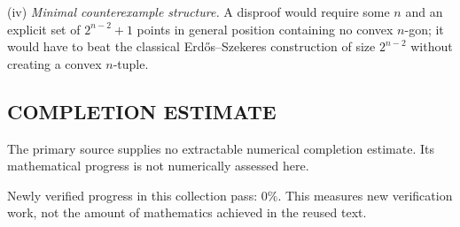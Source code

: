 (iv) \emph{Minimal counterexample structure.}
A disproof would require some $n$ and an explicit set of $2^{n-2}+1$ points in general position containing no convex $n$-gon; it would have to beat the classical Erd\H{o}s--Szekeres construction of size $2^{n-2}$ without creating a convex $n$-tuple.




\subsection*{COMPLETION ESTIMATE}
The primary source supplies no extractable numerical completion estimate. Its mathematical progress is not numerically assessed here.

Newly verified progress in this collection pass: $0\%$. This measures new verification work, not the amount of mathematics achieved in the reused text.
